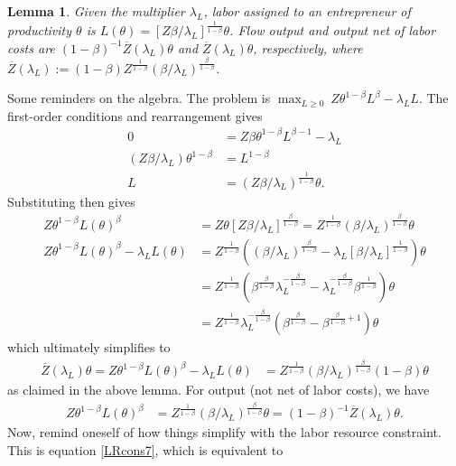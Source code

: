 \documentclass[11pt]{article}
\theoremstyle{plain}
\newtheorem{lemma}[thm]{Lemma}
\begin{document}
\begin{lemma} \label{STATlemma}
Given the multiplier $\lambda_L$, labor assigned to an entrepreneur of productivity $\theta$ is $L(\theta) = [Z\beta/\lambda_L]^{\frac{1}{1-\beta}} \theta$. Flow output and output net of labor costs are $(1-\beta)^{-1}\overline{Z}(\lambda_L)  \theta$ and $\overline{Z}(\lambda_L) \theta$, respectively, where $\overline{Z}(\lambda_L) := (1-\beta)Z^{\frac{1}{1-\beta}}(\beta/\lambda_L)^{\frac{\beta}{1-\beta}}$.
\end{lemma}

\iffalse
Some reminders on the algebra. The problem is $\max_{L \geq 0} \ Z\theta^{1-\beta} L^{\beta} - \lambda_LL$. The first-order conditions and rearrangement gives 
\begin{align*}
0 & = Z\beta \theta^{1-\beta} L^{\beta-1} - \lambda_L
\\ (Z\beta/\lambda_L) \theta^{1-\beta}  & = L^{1-\beta}
\\ L & = (Z\beta/\lambda_L)^{\frac{1}{1-\beta}} \theta. 
\end{align*}
Substituting then gives 
\begin{align*}
Z\theta^{1-\beta}L(\theta)^{\beta} & = Z\theta   [Z\beta/\lambda_L]^{\frac{\beta}{1-\beta}}  = Z^{\frac{1}{1-\beta}}(\beta/\lambda_L)^{\frac{\beta}{1-\beta}} \theta
\\ Z\theta^{1-\beta}L(\theta)^{\beta} - \lambda_LL(\theta) & = Z^{\frac{1}{1-\beta}}((\beta/\lambda_L)^{\frac{\beta}{1-\beta}} - \lambda_L[\beta/\lambda_L]^{\frac{1}{1-\beta}})\theta
\\ & = Z^{\frac{1}{1-\beta}}(\beta^{\frac{\beta}{1-\beta}}\lambda_L^{-\frac{\beta}{1-\beta}} - \lambda_L^{-\frac{\beta}{1-\beta}}\beta^{\frac{1}{1-\beta}} )\theta
\\ & = Z^{\frac{1}{1-\beta}}\lambda_L^{-\frac{\beta}{1-\beta}}(\beta^{\frac{\beta}{1-\beta}} - \beta^{\frac{\beta}{1-\beta}+1} )\theta
\end{align*}
which ultimately simplifies to 
\begin{align*}
\overline{Z}(\lambda_L)\theta = Z\theta^{1-\beta}L(\theta)^{\beta}  - \lambda_LL(\theta) & = 
Z^{\frac{1}{1-\beta}}(\beta/\lambda_L)^{\frac{\beta}{1-\beta}}(1 - \beta)\theta
\end{align*}
as claimed in the above lemma. For output (not net of labor costs), we have 
\begin{align*}
Z\theta^{1-\beta}L(\theta)^{\beta} & = Z^{\frac{1}{1-\beta}}(\beta/\lambda_L)^{\frac{\beta}{1-\beta}} \theta = (1-\beta)^{-1}\overline{Z}(\lambda_L)\theta. 
\end{align*}
Now, remind oneself of how things simplify with the labor resource constraint. This is equation \eqref{LRcons7}, which is equivalent to 
\end{document}
